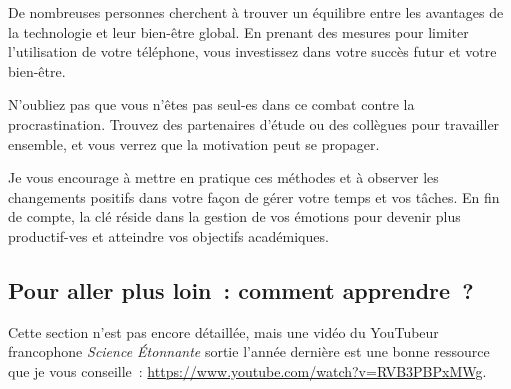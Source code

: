 \documentclass[a4paper, 12pt, garamond]{book}
\begin{document}
De nombreuses personnes cherchent à trouver un équilibre entre les avantages de
la technologie et leur bien-être global. En prenant des mesures pour limiter
l'utilisation de votre téléphone, vous investissez dans votre succès futur et
votre bien-être.

N'oubliez pas que vous n'êtes pas seul-es dans ce combat contre la
procrastination. Trouvez des partenaires d'étude ou des collègues pour
travailler ensemble, et vous verrez que la motivation peut se propager.

Je vous encourage à mettre en pratique ces méthodes et à observer les
changements positifs dans votre façon de gérer votre temps et vos tâches. En fin
de compte, la clé réside dans la gestion de vos émotions pour devenir plus
productif-ves et atteindre vos objectifs académiques.

\subsection{Pour aller plus loin~: comment apprendre~?}
Cette section n'est pas encore détaillée, mais une vidéo du YouTubeur
francophone \textit{Science Étonnante} sortie l'année dernière est une bonne
ressource que je vous conseille~:
\url{https://www.youtube.com/watch?v=RVB3PBPxMWg}.
\end{document}
